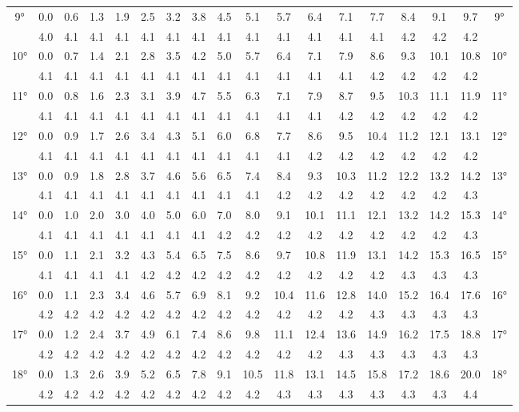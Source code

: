 \begin{scriptsize}
\begin{tabular}{c || c | c | c | c | c | c | c | c | c | c | c | c | c | c | c | c || c}
		\multirow{2}{*}{9°}&0.0&0.6&1.3&1.9&2.5&3.2&3.8&4.5&5.1&5.7&6.4&7.1&7.7&8.4&9.1&9.7&\multirow{2}{*}{9°}\\ \space&4.0&4.1&4.1&4.1&4.1&4.1&4.1&4.1&4.1&4.1&4.1&4.1&4.1&4.2&4.2&4.2&\space\\\hline
		\multirow{2}{*}{10°}&0.0&0.7&1.4&2.1&2.8&3.5&4.2&5.0&5.7&6.4&7.1&7.9&8.6&9.3&10.1&10.8&\multirow{2}{*}{10°}\\ \space&4.1&4.1&4.1&4.1&4.1&4.1&4.1&4.1&4.1&4.1&4.1&4.1&4.2&4.2&4.2&4.2&\space\\\hline
		\multirow{2}{*}{11°}&0.0&0.8&1.6&2.3&3.1&3.9&4.7&5.5&6.3&7.1&7.9&8.7&9.5&10.3&11.1&11.9&\multirow{2}{*}{11°}\\ \space&4.1&4.1&4.1&4.1&4.1&4.1&4.1&4.1&4.1&4.1&4.1&4.2&4.2&4.2&4.2&4.2&\space\\\hline
		\multirow{2}{*}{12°}&0.0&0.9&1.7&2.6&3.4&4.3&5.1&6.0&6.8&7.7&8.6&9.5&10.4&11.2&12.1&13.1&\multirow{2}{*}{12°}\\ \space&4.1&4.1&4.1&4.1&4.1&4.1&4.1&4.1&4.1&4.1&4.2&4.2&4.2&4.2&4.2&4.2&\space\\\hline
		\multirow{2}{*}{13°}&0.0&0.9&1.8&2.8&3.7&4.6&5.6&6.5&7.4&8.4&9.3&10.3&11.2&12.2&13.2&14.2&\multirow{2}{*}{13°}\\ \space&4.1&4.1&4.1&4.1&4.1&4.1&4.1&4.1&4.1&4.2&4.2&4.2&4.2&4.2&4.2&4.3&\space\\\hline
		\multirow{2}{*}{14°}&0.0&1.0&2.0&3.0&4.0&5.0&6.0&7.0&8.0&9.1&10.1&11.1&12.1&13.2&14.2&15.3&\multirow{2}{*}{14°}\\ \space&4.1&4.1&4.1&4.1&4.1&4.1&4.1&4.2&4.2&4.2&4.2&4.2&4.2&4.2&4.2&4.3&\space\\\hline
		\multirow{2}{*}{15°}&0.0&1.1&2.1&3.2&4.3&5.4&6.5&7.5&8.6&9.7&10.8&11.9&13.1&14.2&15.3&16.5&\multirow{2}{*}{15°}\\ \space&4.1&4.1&4.1&4.1&4.2&4.2&4.2&4.2&4.2&4.2&4.2&4.2&4.2&4.3&4.3&4.3&\space\\\hline
		\multirow{2}{*}{16°}&0.0&1.1&2.3&3.4&4.6&5.7&6.9&8.1&9.2&10.4&11.6&12.8&14.0&15.2&16.4&17.6&\multirow{2}{*}{16°}\\ \space&4.2&4.2&4.2&4.2&4.2&4.2&4.2&4.2&4.2&4.2&4.2&4.2&4.3&4.3&4.3&4.3&\space\\\hline
		\multirow{2}{*}{17°}&0.0&1.2&2.4&3.7&4.9&6.1&7.4&8.6&9.8&11.1&12.4&13.6&14.9&16.2&17.5&18.8&\multirow{2}{*}{17°}\\ \space&4.2&4.2&4.2&4.2&4.2&4.2&4.2&4.2&4.2&4.2&4.2&4.3&4.3&4.3&4.3&4.3&\space\\\hline
		\multirow{2}{*}{18°}&0.0&1.3&2.6&3.9&5.2&6.5&7.8&9.1&10.5&11.8&13.1&14.5&15.8&17.2&18.6&20.0&\multirow{2}{*}{18°}\\ \space&4.2&4.2&4.2&4.2&4.2&4.2&4.2&4.2&4.2&4.3&4.3&4.3&4.3&4.3&4.3&4.4&\space\\\hline

\end{tabular}
\end{scriptsize}
